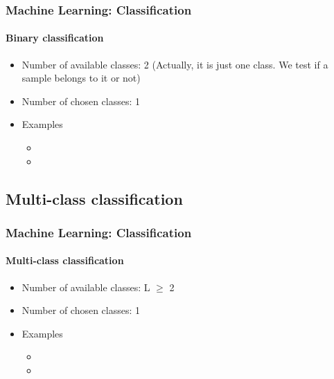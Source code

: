 \documentclass[xcolor=table]{beamer}
\begin{document}
\begin{frame}
	\frametitle{Machine Learning: Classification}
	\framesubtitle{Binary classification}
	
	\begin{minipage}{0.65\textwidth}
	\begin{itemize}
		\item Number of available classes: 2 (Actually, it is just one class. We test if a sample belongs to it or not)
		\item Number of chosen classes: 1
		\item Examples
		\begin{itemize}
			\item {}
			\item {}
		\end{itemize}
	\end{itemize}
	\end{minipage}
	\begin{minipage}{0.3\textwidth}
	\end{minipage}
	
\end{frame}

\subsection{Multi-class classification}

\begin{frame}
	\frametitle{Machine Learning: Classification}
	\framesubtitle{Multi-class classification}
	
	\begin{minipage}{0.65\textwidth}
	\begin{itemize}
		\item Number of available classes: L $ \ge $ 2
		\item Number of chosen classes: 1
		\item Examples
		\begin{itemize}
			\item {}
			\item {}
		\end{itemize}
	\end{itemize}
	\end{minipage}
	\begin{minipage}{0.3\textwidth}
	\end{minipage}
	
\end{frame}
\end{document}
